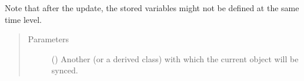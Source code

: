 \documentclass[letterpaper,10pt,english]{sphinxmanual}
\begin{document}
\begin{fulllineitems}
\begin{fulllineitems}
\begin{itemize}
\end{itemize}

Note that after the update, the stored variables might not be defined at the same time level.
\begin{quote}\begin{description}
\item[{Parameters}] \leavevmode
{} () \textendash{} Another {\hyperref[\detokenize{api:storages.grid_data.GridData}]{}} (or a derived class) with which the current object will be synced.

\end{description}\end{quote}

\end{fulllineitems}


\end{fulllineitems}

\end{document}
